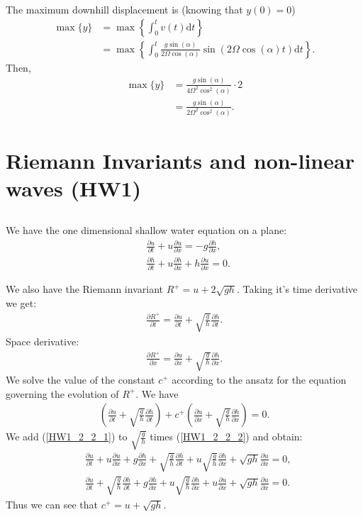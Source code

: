 \documentclass[11pt,letterpaper]{book}
\theoremstyle{definition}
\newcommand{\de}{\mathrm{d}}
\newcommand{\pe}{\partial}
\newcommand{\dsp}{\displaystyle}
\begin{document}
The maximum downhill displacement is (knowing that $y(0) = 0$)
\begin{align*}
\max \{y\} &= \max\left\{ \int_0^t v(t)\de t \right\}\\
&= \max\left\{ \int_0^t \frac{g\sin(\alpha)}{2\Omega\cos(\alpha)}\sin(2\Omega \cos(\alpha)t) \de t \right\}.
\end{align*}
Then, 
\begin{align*}
\max \{y\} &= \frac{g\sin(\alpha)}{4\Omega^2\cos^2(\alpha)}\cdot 2\\
&= \frac{g\sin(\alpha)}{2\Omega^2\cos^2(\alpha)}.
\end{align*}

\section{Riemann Invariants and non-linear waves (HW1)}
\subsection{}
We have the one dimensional shallow water equation on a plane:
\begin{align}
&\frac{\pe u}{\pe t}+u\frac{\pe u}{\pe x} = -g\frac{\pe h}{\pe x} \label{HW1_2_2_1},\\
&\frac{\pe h}{\pe t}+u\frac{\pe h}{\pe x}+h\frac{\pe u}{\pe x} = 0\label{HW1_2_2_2}.
\end{align}

We also have the Riemann invariant $R^+ = u+2\sqrt{gh}$. Taking it's time derivative we get:
\begin{align*}
\frac{\pe R^+}{\pe t} = \frac{\pe u}{\pe t}+\sqrt{\frac{g}{h}}\frac{\pe h}{\pe t}.
\end{align*}
Space derivative:
\begin{align*}
\frac{\pe R^+}{\pe x} = \frac{\pe u}{\pe x}+\sqrt{\frac{g}{h}}\frac{\pe h}{\pe x}.
\end{align*}
We solve the value of the constant $c^+$ according to the ansatz for the equation governing the evolution of $R^+$. We have
\begin{align*}
\left( \frac{\pe u}{\pe t}+\sqrt{\frac{g}{h}}\frac{\pe h}{\pe t} \right)+c^+\left( \frac{\pe u}{\pe x}+\sqrt{\frac{g}{h}}\frac{\pe h}{\pe x} \right) = 0.
\end{align*}
We add (\ref{HW1_2_2_1}) to $\dsp{\sqrt{\frac{g}{h}}}$ times (\ref{HW1_2_2_2}) and obtain:
\begin{align*}
&\frac{\pe u}{\pe t}+u\frac{\pe u}{\pe x} + g\frac{\pe h}{\pe x}+\sqrt{\frac{g}{h}}\frac{\pe h}{\pe t}+u\sqrt{\frac{g}{h}}\frac{\pe h}{\pe x}+\sqrt{gh}\frac{\pe u}{\pe x} = 0,\\
&\frac{\pe u}{\pe t}+\sqrt{\frac{g}{h}}\frac{\pe h}{\pe t}+ g\frac{\pe h}{\pe x}+u\sqrt{\frac{g}{h}}\frac{\pe h}{\pe x}+u\frac{\pe u}{\pe x} +\sqrt{gh}\frac{\pe u}{\pe x} = 0.
\end{align*}
Thus we can see that $c^+ = u+\sqrt{gh}$. 
\end{document}
